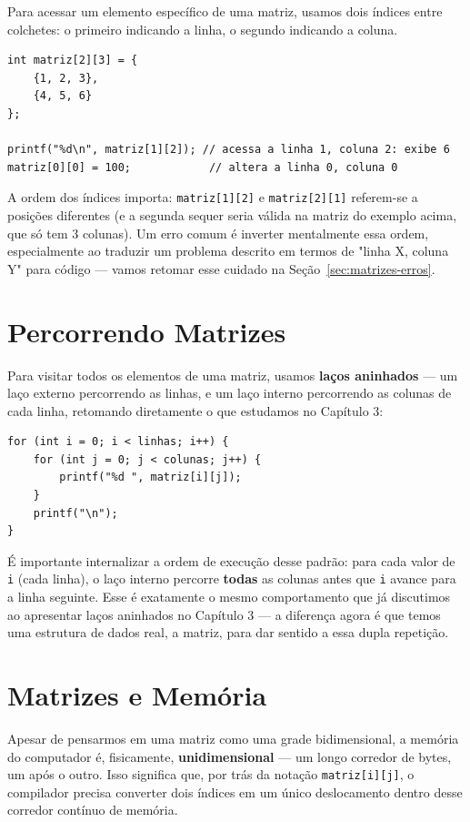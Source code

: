 \documentclass[12pt,a4paper,oneside]{extreport}
\begin{document}
Para acessar um elemento específico de uma matriz, usamos dois índices entre colchetes: o primeiro indicando a linha, o segundo indicando a coluna.

\begin{lstlisting}
int matriz[2][3] = {
    {1, 2, 3},
    {4, 5, 6}
};

printf("%d\n", matriz[1][2]); // acessa a linha 1, coluna 2: exibe 6
matriz[0][0] = 100;            // altera a linha 0, coluna 0
\end{lstlisting}

A ordem dos índices importa: \texttt{matriz[1][2]} e \texttt{matriz[2][1]} referem-se a posições diferentes (e a segunda sequer seria válida na matriz do exemplo acima, que só tem 3 colunas). Um erro comum é inverter mentalmente essa ordem, especialmente ao traduzir um problema descrito em termos de "linha X, coluna Y" para código — vamos retomar esse cuidado na Seção~\ref{sec:matrizes-erros}.

\section{Percorrendo Matrizes}
\label{sec:matrizes-percorrendo}

Para visitar todos os elementos de uma matriz, usamos \textbf{laços aninhados} — um laço externo percorrendo as linhas, e um laço interno percorrendo as colunas de cada linha, retomando diretamente o que estudamos no Capítulo 3:

\begin{lstlisting}
for (int i = 0; i < linhas; i++) {
    for (int j = 0; j < colunas; j++) {
        printf("%d ", matriz[i][j]);
    }
    printf("\n");
}
\end{lstlisting}

É importante internalizar a ordem de execução desse padrão: para cada valor de \texttt{i} (cada linha), o laço interno percorre \textbf{todas} as colunas antes que \texttt{i} avance para a linha seguinte. Esse é exatamente o mesmo comportamento que já discutimos ao apresentar laços aninhados no Capítulo 3 — a diferença agora é que temos uma estrutura de dados real, a matriz, para dar sentido a essa dupla repetição.

\section{Matrizes e Memória}
\label{sec:matrizes-memoria}

Apesar de pensarmos em uma matriz como uma grade bidimensional, a memória do computador é, fisicamente, \textbf{unidimensional} — um longo corredor de bytes, um após o outro. Isso significa que, por trás da notação \texttt{matriz[i][j]}, o compilador precisa converter dois índices em um único deslocamento dentro desse corredor contínuo de memória.
\end{document}
